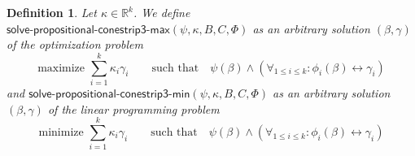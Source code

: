 \documentclass{article}
\theoremstyle{mytheorem}
\newtheorem{definition}[theorem]{Definition}
\newcommand{\func}[1]{\ensuremath{\textsf{#1}}} %
\newcommand{\set}[1]{\ensuremath{\{ #1 \} }} %
\begin{document}



\clearpage
\begin{definition}
Let $\kappa \in \mathbb{R}^k$. We define $\func{solve-propositional-conestrip3-max}(\psi, \kappa, B, C, \Phi)$ as an arbitrary solution $(\beta, \gamma)$ of the optimization problem
\begin{equation} \label{eq:propositional_conestrip3max}
    \text{maximize } \sum\limits_{i = 1}^k \kappa_i \gamma_i
    \qquad \text{such that} \quad
         \psi(\beta) \land 
         \left( \forall_{1 \leq i \leq k}: \phi_i(\beta) \leftrightarrow \gamma_i \right)
\end{equation}
and
$\func{solve-propositional-conestrip3-min}(\psi, \kappa, B, C, \Phi)$ as an arbitrary solution $(\beta, \gamma)$ of the linear programming problem
\begin{equation} \label{eq:propositional_conestrip3min}
    \text{minimize } \sum\limits_{i = 1}^k \kappa_i \gamma_i
    \qquad \text{such that} \quad
         \psi(\beta) \land 
         \left( \forall_{1 \leq i \leq k}: \phi_i(\beta) \leftrightarrow \gamma_i \right)
\end{equation}
\end{definition}
\end{document}
